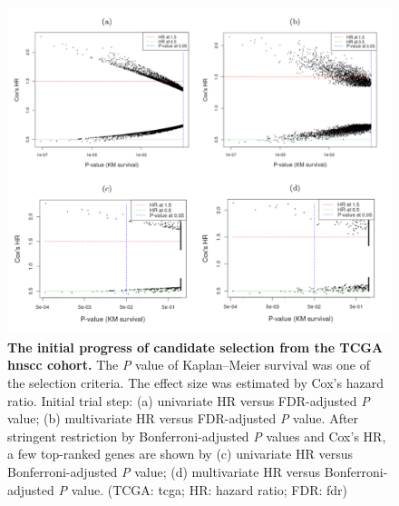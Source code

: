 \documentclass[
paper=landscape,
paper=160mm:90mm, %
fontsize=11pt, %
pagesize, %
parskip=half-, %
]{scrartcl} %
\newcommand{\bcaption}[2]{\caption{\textbf{#1} #2}}
\theoremstyle{mythmstyle} %
\begin{document}
\clearpage

\begin{figure}[hbt!]
\centering
\includegraphics[width =\textwidth, height = 0.6\textheight, keepaspectratio]{Figure2.pdf}
\bcaption{The initial progress of candidate selection from the TCGA \acrshort{hnscc} cohort.}{The \protect\textit{P} value of Kaplan--Meier survival was one of the selection criteria.
The effect size was estimated by Cox's hazard ratio.
Initial trial step: (a) univariate HR versus FDR-adjusted \protect\textit{P} value; (b) multivariate HR versus FDR-adjusted \protect\textit{P} value.
After stringent restriction by Bonferroni-adjusted \protect\textit{P} values and Cox's HR, a few top-ranked genes are shown by
(c) univariate HR versus Bonferroni-adjusted \protect\textit{P} value;  (d) multivariate HR versus Bonferroni-adjusted \protect\textit{P} value.
(TCGA: \acrlong{tcga}; HR: hazard ratio; FDR: \acrlong{fdr})}
\end{figure}

\clearpage
\end{document}
